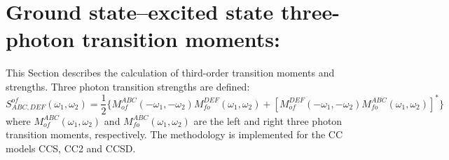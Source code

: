
\section{Ground state--excited state three-photon 
transition moments: }\label{sec:cctm}

This Section describes the calculation of third-order transition
moments and strengths. Three photon transition strengths are defined:
{\small \[
S^{of}_{ABC,DEF}(\omega_1,\omega_2) = \frac{1}{2} 
       \{ M^{ABC}_{of}(-\omega_1,-\omega_2) M^{DEF}_{fo}(\omega_1,\omega_2)
        +[M^{DEF}_{of}(-\omega_1,-\omega_2) M^{ABC}_{fo}(\omega_1,\omega_2)]^\ast\}
\] }
where $M^{ABC}_{of}(\omega_1,\omega_2)$ and $M^{ABC}_{fo}(\omega_1,\omega_2)$
are the left and right three photon transition moments, respectively.
The methodology is implemented for the CC models CCS, CC2 and CCSD.

\begin{center}
\end{center}

